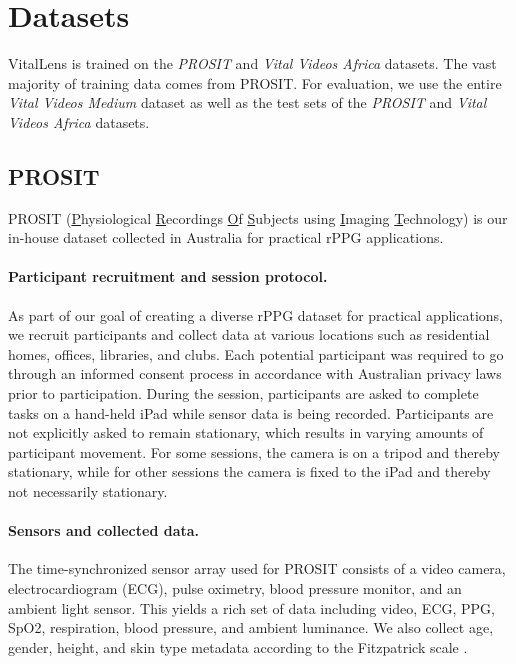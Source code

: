\documentclass{article}
\begin{document}
\section{Datasets}
\label{sec:datasets}

VitalLens is trained on the \textit{PROSIT} and \textit{Vital Videos Africa} datasets.
The vast majority of training data comes from PROSIT.
For evaluation, we use the entire \textit{Vital Videos Medium} dataset as well as the test sets of the \textit{PROSIT} and \textit{Vital Videos Africa} datasets.

\subsection{PROSIT}

PROSIT (\underline{P}hysiological \underline{R}ecordings \underline{O}f \underline{S}ubjects using \underline{I}maging \underline{T}echnology) is our in-house dataset collected in Australia for practical rPPG applications.

\paragraph{Participant recruitment and session protocol.} 
As part of our goal of creating a diverse rPPG dataset for practical applications, we recruit participants and collect data at various locations such as residential homes, offices, libraries, and clubs.
Each potential participant was required to go through an informed consent process in accordance with Australian privacy laws prior to participation.
During the session, participants are asked to complete tasks on a hand-held iPad while sensor data is being recorded.
Participants are not explicitly asked to remain stationary, which results in varying amounts of participant movement.
For some sessions, the camera is on a tripod and thereby stationary, while for other sessions the camera is fixed to the iPad and thereby not necessarily stationary.

\paragraph{Sensors and collected data.}
The time-synchronized sensor array used for PROSIT consists of a video camera, electrocardiogram (ECG), pulse oximetry, blood pressure monitor, and an ambient light sensor.
This yields a rich set of data including video, ECG, PPG, SpO2, respiration, blood pressure, and ambient luminance.
We also collect age, gender, height, and skin type metadata according to the Fitzpatrick scale \cite{fitzpatrick1975soleil}.
\end{document}
